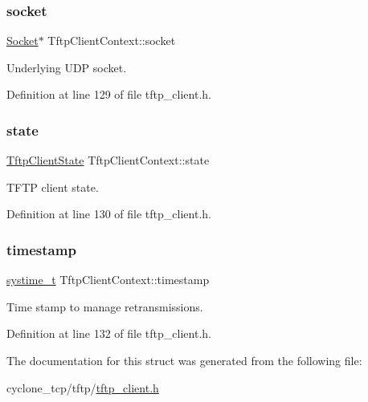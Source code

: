 \subsubsection{\texorpdfstring{socket}{socket}}
{\footnotesize\ttfamily \hyperlink{socket_8h_aa85acfb0fa336ef495e6ba87fb88fc48}{Socket}$\ast$ Tftp\+Client\+Context\+::socket}



Underlying U\+DP socket. 



Definition at line 129 of file tftp\+\_\+client.\+h.

\mbox{\label{structTftpClientContext_a5458f1f0af1bf1962312b07d364c9d09}} 
\subsubsection{\texorpdfstring{state}{state}}
{\footnotesize\ttfamily \hyperlink{tftp__client_8h_a309912fa47abe84e19aafb1f1a9e8174}{Tftp\+Client\+State} Tftp\+Client\+Context\+::state}



T\+F\+TP client state. 



Definition at line 130 of file tftp\+\_\+client.\+h.

\mbox{\label{structTftpClientContext_a3f3e170f2e6bbde98ca73a0526fee76c}} 
\subsubsection{\texorpdfstring{timestamp}{timestamp}}
{\footnotesize\ttfamily \hyperlink{compiler__port_8h_ae3e32a98d431a02106616da3071832dd}{systime\+\_\+t} Tftp\+Client\+Context\+::timestamp}



Time stamp to manage retransmissions. 



Definition at line 132 of file tftp\+\_\+client.\+h.



The documentation for this struct was generated from the following file\+:\begin{DoxyCompactItemize}
\item 
cyclone\+\_\+tcp/tftp/\hyperlink{tftp__client_8h}{tftp\+\_\+client.\+h}\end{DoxyCompactItemize}
